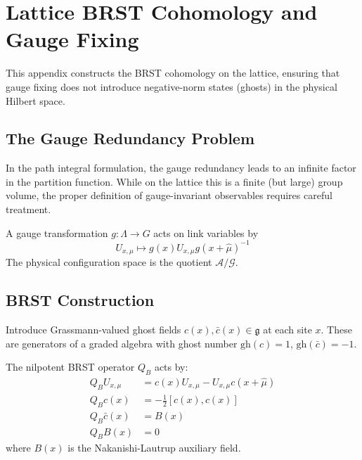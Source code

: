\section{Lattice BRST Cohomology and Gauge Fixing}
\label{ch:fix34_brst}

This appendix constructs the BRST cohomology on the lattice, ensuring that gauge fixing does not introduce negative-norm states (ghosts) in the physical Hilbert space.

\subsection{The Gauge Redundancy Problem}

In the path integral formulation, the gauge redundancy leads to an infinite factor in the partition function. While on the lattice this is a finite (but large) group volume, the proper definition of gauge-invariant observables requires careful treatment.

\begin{definition}
A gauge transformation $g: \Lambda \to G$ acts on link variables by
\begin{equation}
    U_{x,\mu} \mapsto g(x) U_{x,\mu} g(x+\hat{\mu})^{-1}
\end{equation}
The physical configuration space is the quotient $\mathcal{A}/\mathcal{G}$.
\end{definition}

\subsection{BRST Construction}

\begin{definition}
Introduce Grassmann-valued ghost fields $c(x), \bar{c}(x) \in \mathfrak{g}$ at each site $x$. These are generators of a graded algebra with ghost number $\text{gh}(c) = 1$, $\text{gh}(\bar{c}) = -1$.
\end{definition}

\begin{definition}
The nilpotent BRST operator $Q_B$ acts by:
\begin{align}
    Q_B U_{x,\mu} &= c(x) U_{x,\mu} - U_{x,\mu} c(x+\hat{\mu}) \\
    Q_B c(x) &= -\frac{1}{2}[c(x), c(x)] \\
    Q_B \bar{c}(x) &= B(x) \\
    Q_B B(x) &= 0
\end{align}
where $B(x)$ is the Nakanishi-Lautrup auxiliary field.
\end{definition}

